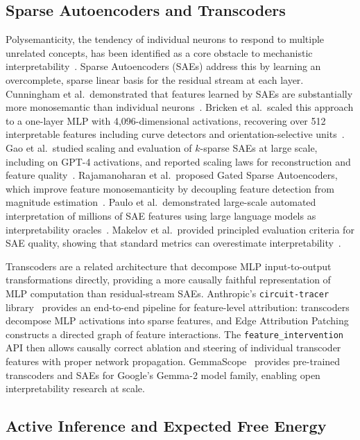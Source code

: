 \subsection{Sparse Autoencoders and Transcoders}

Polysemanticity, the tendency of individual neurons to respond to multiple unrelated
concepts, has been identified as a core obstacle to mechanistic
interpretability~\cite{Olah2020,Bricken2023}. Sparse Autoencoders (SAEs) address this
by learning an overcomplete, sparse linear basis for the residual stream at each layer.
Cunningham et al.\ demonstrated that features learned by SAEs are substantially more
monosemantic than individual neurons~\cite{Cunningham2024}. Bricken et al.\ scaled
this approach to a one-layer MLP with 4,096-dimensional activations, recovering over
512 interpretable features including curve detectors and orientation-selective
units~\cite{Bricken2023}. Gao et al.\ studied scaling and evaluation of $k$-sparse SAEs at large scale,
including on {GPT-4} activations, and reported scaling laws for reconstruction
and feature quality~\cite{Gao2024}.
Rajamanoharan et al.\ proposed Gated Sparse Autoencoders, which improve feature
monosemanticity by decoupling feature detection from magnitude
estimation~\cite{Rajamanoharan2024}. Paulo et al.\ demonstrated large-scale automated
interpretation of millions of SAE features using large language models as
interpretability oracles~\cite{Paulo2024}. Makelov et al.\ provided principled evaluation criteria for
SAE quality, showing that standard metrics can overestimate
interpretability~\cite{Makelov2024}.

Transcoders are a related architecture that decompose MLP input-to-output
transformations directly, providing a more causally faithful representation of MLP
computation than residual-stream SAEs. Anthropic's \texttt{circuit-tracer}
library~\cite{Anthropic2025CT,Ameisen2025} provides an end-to-end pipeline for
feature-level attribution: transcoders decompose MLP activations into sparse
features, and Edge Attribution Patching constructs a directed graph of feature
interactions.  The \texttt{feature\_intervention} API then allows causally correct
ablation and steering of individual transcoder features with proper network
propagation.  GemmaScope~\cite{team2024gemma,GemmaScope2024} provides pre-trained transcoders and
SAEs for Google's Gemma-2 model family, enabling open interpretability research at scale.

\subsection{Active Inference and Expected Free Energy}

